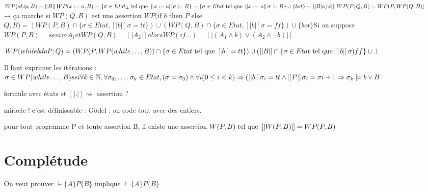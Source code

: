 \documentclass[10pt,a4paper]{article}
\newcommand{\semm}[1]{\left[| #1 | \right]}
\newcommand{\semh}[3]{\{#1\}#2\{#3\}}
\begin{document}
$WP(skip,B) = \semm{B}
WP(x:=a,B) = \{ \sigma \in Etat_{\bot} \tq \semm{x := a} \sigma \models B\}
	   = \{ \sigma \in Etat \tq \semm{x := a} \sigma \models B\} \cup \{bot\} = \semm{B[a/x]}
WP(P;Q,B) = WP(P, WP(Q,B))$ → ça marche si $WP(Q,B)$ est une assertion
$WP($if $b$ then $P$ else $Q, B) = (WP(P,B) \cap \{\sigma \in Etat, \semm b \sigma = tt \})
			\cup (WP(Q,B) \cap \{\sigma \in Etat, \semm b \sigma = ff \})
			\cup \{bot\}
$Si on suppose $WP(P,B) = semm{A_1} et WP(Q,B) = \semm{A_2} alors WP(if \dots) = \semm{ ( A_1 \wedge b) \vee (A_2 \wedge \lnot b)}$

$WP(while b do P; Q) = (WP(P, WP(while \dots , B)) \cap \{\sigma \in Etat \tq \semm{b} = tt \})
		      \cup (\semm{B} \cap \{\sigma \in Etat \tq \semm b \sigma ) ff \}
		      \cup {\bot}$

Il faut exprimer les itérations : 
$\sigma \in WP(while \dots, B) ssi \forall k \in \Ns , \forall \sigma_0, \dots, \sigma_k \in Etat, 
				    (\sigma = \sigma_0) \wedge \forall i ( 0 \leq i < k) \Rightarrow (\semm{b} \sigma_i = tt \wedge \semm{P} \sigma_i = \sigma i+1
				    \Rightarrow \sigma_k \models b \vee B$

formule avec états et $\semm{.} \rightsquigarrow$ assertion ?

miracle ! c'est définissable : Gödel : on code tout avec des entiers.

\begin{thm}
 pour tout programme P et toute assertion B, il existe une assertion $W(P,B) \tq \semm{W(P,B)} = WP(P,B)$
\end{thm}

\section{Complétude}
On veut prouver $\models \semh{A}{P}{B}$ implique $\vdash \semh{A}{P}{B}$
\end{document}
